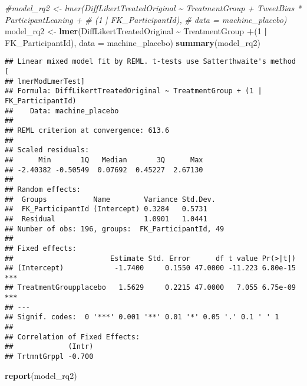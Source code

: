 \documentclass[
]{article}
\newenvironment{Shaded}{\begin{snugshade}}{\end{snugshade}}
\newcommand{\AttributeTok}[1]{\textcolor[rgb]{0.13,0.29,0.53}{#1}}
\newcommand{\CommentTok}[1]{\textcolor[rgb]{0.56,0.35,0.01}{\textit{#1}}}
\newcommand{\DecValTok}[1]{\textcolor[rgb]{0.00,0.00,0.81}{#1}}
\newcommand{\FunctionTok}[1]{\textcolor[rgb]{0.13,0.29,0.53}{\textbf{#1}}}
\newcommand{\NormalTok}[1]{#1}
\newcommand{\OtherTok}[1]{\textcolor[rgb]{0.56,0.35,0.01}{#1}}
\newcommand{\SpecialCharTok}[1]{\textcolor[rgb]{0.81,0.36,0.00}{\textbf{#1}}}
\begin{document}
\begin{Shaded}
\begin{Highlighting}[]
\CommentTok{\#model\_rq2 \textless{}{-} lmer(DiffLikertTreatedOriginal \textasciitilde{} TreatmentGroup + TweetBias * ParticipantLeaning + }
\CommentTok{\#                  (1 | FK\_ParticipantId), }
\CommentTok{\#                  data = machine\_placebo)}
\NormalTok{model\_rq2 }\OtherTok{\textless{}{-}} \FunctionTok{lmer}\NormalTok{(DiffLikertTreatedOriginal }\SpecialCharTok{\textasciitilde{}}\NormalTok{ TreatmentGroup }\SpecialCharTok{+}\NormalTok{(}\DecValTok{1} \SpecialCharTok{|}\NormalTok{ FK\_ParticipantId), }
                  \AttributeTok{data =}\NormalTok{ machine\_placebo)}
\FunctionTok{summary}\NormalTok{(model\_rq2)}
\end{Highlighting}
\end{Shaded}

\begin{verbatim}
## Linear mixed model fit by REML. t-tests use Satterthwaite's method [
## lmerModLmerTest]
## Formula: DiffLikertTreatedOriginal ~ TreatmentGroup + (1 | FK_ParticipantId)
##    Data: machine_placebo
## 
## REML criterion at convergence: 613.6
## 
## Scaled residuals: 
##      Min       1Q   Median       3Q      Max 
## -2.40382 -0.50549  0.07692  0.45227  2.67130 
## 
## Random effects:
##  Groups           Name        Variance Std.Dev.
##  FK_ParticipantId (Intercept) 0.3284   0.5731  
##  Residual                     1.0901   1.0441  
## Number of obs: 196, groups:  FK_ParticipantId, 49
## 
## Fixed effects:
##                       Estimate Std. Error      df t value Pr(>|t|)    
## (Intercept)            -1.7400     0.1550 47.0000 -11.223 6.80e-15 ***
## TreatmentGroupplacebo   1.5629     0.2215 47.0000   7.055 6.75e-09 ***
## ---
## Signif. codes:  0 '***' 0.001 '**' 0.01 '*' 0.05 '.' 0.1 ' ' 1
## 
## Correlation of Fixed Effects:
##             (Intr)
## TrtmntGrppl -0.700
\end{verbatim}

\begin{Shaded}
\begin{Highlighting}[]
\FunctionTok{report}\NormalTok{(model\_rq2)}
\end{Highlighting}
\end{Shaded}
\end{document}
